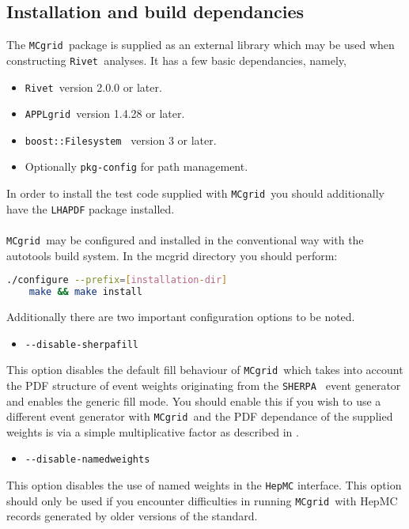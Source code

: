 \documentclass[11pt]{article}
\newcommand{\mcgrid} {{\tt MCgrid }}
\newcommand{\rivet} {{\tt Rivet }}
\newcommand{\appl} {{\tt APPLgrid }}
\newcommand{\sherpa} {{\tt SHERPA }}
\begin{document}
\subsection{Installation and build dependancies}
The \mcgrid package is supplied as an external library which may be used when constructing \rivet analyses. It has a few basic dependancies, namely,
\begin{itemize}
\item \rivet version 2.0.0 or later.
\item \appl version 1.4.28 or later.
\item {\tt boost::Filesystem } version 3 or later.
\item Optionally {\tt pkg-config} for path management.
\end{itemize}
In order to install the test code supplied with \mcgrid you should additionally have the {\tt LHAPDF} package installed. 
\\\\
\mcgrid may be configured and installed in the conventional way with the autotools build system. In the mcgrid directory you should perform:
\begin{lstlisting}[language=bash]
	./configure --prefix=[installation-dir]
	make && make install
\end{lstlisting}
Additionally there are two important configuration options to be noted.
\begin{itemize}
\item \lstinline[language=bash]{--disable-sherpafill }
\end{itemize}
This option disables the default fill behaviour of \mcgrid which takes into account the PDF structure of event weights originating from the \sherpa\cite{Gleisberg:2008ta} event generator and enables the generic fill mode. You should enable this if you wish to use a different event generator with \mcgrid and the PDF dependance of the supplied weights is via a simple multiplicative factor as described in \cite{cpc}.
\begin{itemize}
\item \lstinline[language=bash]{--disable-namedweights }
\end{itemize}
This option disables the use of named weights in the {\tt HepMC}\cite{Dobbs:2001ck} interface. This option should only be used if you encounter difficulties in running \mcgrid with HepMC records generated by older versions of the standard.
\vskip5pt
\end{document}
